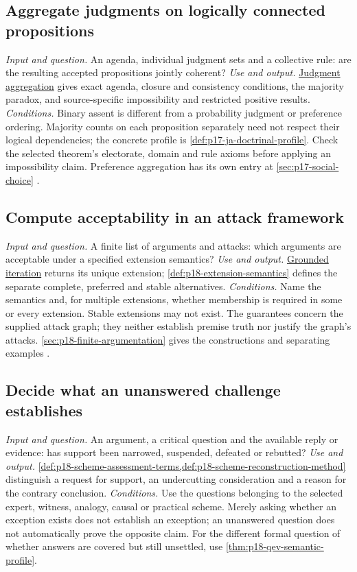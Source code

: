 \subsection{Aggregate judgments on logically connected propositions}
\label{sec:p14-finder-aggregation}
\textit{Input and question.} An agenda, individual judgment sets and a
collective rule: are the resulting accepted propositions jointly coherent?
\textit{Use and output.}
\hyperref[sec:p17-judgment-aggregation]{Judgment aggregation} gives exact
agenda, closure and consistency conditions, the majority paradox, and
source-specific impossibility and restricted positive results.
\textit{Conditions.} Binary assent is different from a probability judgment
or preference ordering. Majority counts on each proposition separately need
not respect their logical dependencies; the concrete profile is
\cref{def:p17-ja-doctrinal-profile}. Check the selected theorem's electorate,
domain and rule axioms before applying an impossibility claim. Preference
aggregation has its own entry at \cref{sec:p17-social-choice}
\cite{ListPettit2001JudgmentPreprint}.

\subsection{Compute acceptability in an attack framework}
\label{sec:p14-finder-acceptability}
\textit{Input and question.} A finite list of arguments and attacks: which
arguments are acceptable under a specified extension semantics?
\textit{Use and output.}
\hyperref[def:p18-grounded-procedure]{Grounded iteration} returns its unique
extension; \cref{def:p18-extension-semantics} defines the separate complete,
preferred and stable alternatives.
\textit{Conditions.} Name the semantics and, for multiple extensions, whether
membership is required in some or every extension. Stable extensions may not
exist. The guarantees concern the supplied attack graph; they neither
establish premise truth nor justify the graph's attacks.
\cref{sec:p18-finite-argumentation} gives the constructions and separating
examples \cite[secs.~2.1--2.2, pp.~325--330]{Dung1995}.

\subsection{Decide what an unanswered challenge establishes}
\label{sec:p14-finder-challenge}
\textit{Input and question.} An argument, a critical question and the available
reply or evidence: has support been narrowed, suspended, defeated or rebutted?
\textit{Use and output.}
\cref{def:p18-scheme-assessment-terms,def:p18-scheme-reconstruction-method}
distinguish a request for support, an undercutting consideration and a reason
for the contrary conclusion.
\textit{Conditions.} Use the questions belonging to the selected expert,
witness, analogy, causal or practical scheme. Merely asking whether an
exception exists does not establish an exception; an unanswered question does
not automatically prove the opposite claim. For the different formal question
of whether answers are covered but still unsettled, use
\cref{thm:p18-qev-semantic-profile}.

